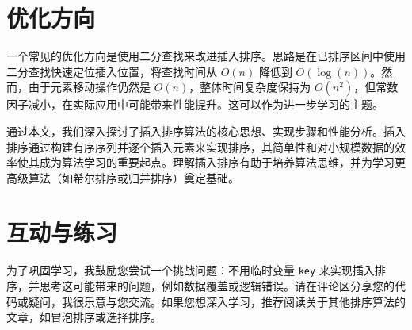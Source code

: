 \chapter{优化方向}
一个常见的优化方向是使用二分查找来改进插入排序。思路是在已排序区间中使用二分查找快速定位插入位置，将查找时间从 $O(n)$ 降低到 $O(\log(n))$。然而，由于元素移动操作仍然是 $O(n)$，整体时间复杂度保持为 $O(n^2)$，但常数因子减小，在实际应用中可能带来性能提升。这可以作为进一步学习的主题。\par
通过本文，我们深入探讨了插入排序算法的核心思想、实现步骤和性能分析。插入排序通过构建有序序列并逐个插入元素来实现排序，其简单性和对小规模数据的效率使其成为算法学习的重要起点。理解插入排序有助于培养算法思维，并为学习更高级算法（如希尔排序或归并排序）奠定基础。\par
\chapter{互动与练习}
为了巩固学习，我鼓励您尝试一个挑战问题：不用临时变量 \texttt{key} 来实现插入排序，并思考这可能带来的问题，例如数据覆盖或逻辑错误。请在评论区分享您的代码或疑问，我很乐意与您交流。如果您想深入学习，推荐阅读关于其他排序算法的文章，如冒泡排序或选择排序。\par
